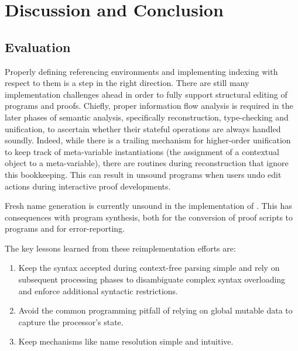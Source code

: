 \chapter{Discussion and Conclusion}


\section{Evaluation}


Properly defining referencing environments and implementing indexing with respect to them is a step in the right direction.
There are still many implementation challenges ahead in order to fully support structural editing of \Beluga programs and \Harpoon proofs.
Chiefly, proper information flow analysis is required in the later phases of semantic analysis, specifically reconstruction, type-checking and unification, to ascertain whether their stateful operations are always handled soundly.
Indeed, while there is a trailing mechanism for higher-order unification to keep track of meta-variable instantiations (the assignment of a contextual object to a meta-variable), there are routines during \LF reconstruction that ignore this bookkeeping.
This can result in unsound programs when users undo edit actions during interactive proof developments.

Fresh name generation is currently unsound in the implementation of \Beluga.
This has consequences with program synthesis, both for the conversion of \Harpoon proof scripts to \Beluga programs and for error-reporting.

The key lessons learned from these reimplementation efforts are:

\begin{enumerate}
\item Keep the syntax accepted during context-free parsing simple and rely on subsequent processing phases to disambiguate complex syntax overloading and enforce additional syntactic restrictions.
\item Avoid the common programming pitfall of relying on global mutable data to capture the processor's state.
\item Keep mechanisms like name resolution simple and intuitive.
\end{enumerate}

